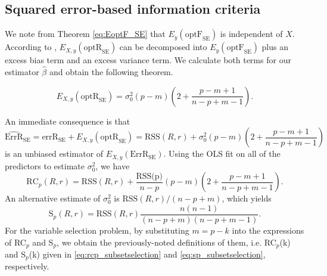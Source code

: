 \subsection{Squared error-based information criteria}
We note from Theorem \ref{eq:EoptF_SE} that $E_y(\text{optF}_\text{SE})$ is independent of $X$. According to \citet[formula 6 and proposition 1]{rosset2020fixed}, $E_{X,y}(\text{optR}_\text{SE})$ can be decomposed into $E_y(\text{optF}_\text{SE})$ plus an excess bias term and an excess variance term. We calculate both terms for our estimator $\hat\beta$ and obtain the following theorem.
\begin{theorem}
\begin{equation*}
E_{X,y}(\text{optR}_\text{SE}) = \sigma_0^2(p-m) \left( 2+ \frac{p-m+1}{n-p+m-1} \right).
\end{equation*}
\label{thm:EoptR_SE}
\end{theorem}
An immediate consequence is that
\begin{equation*}
\widehat{\text{ErrR}}_\text{SE} = \text{errR}_\text{SE} + E_{X,y} (\text{optR}_\text{SE}) = \text{RSS}(R,r) + \sigma_0^2(p-m) \left( 2+ \frac{p-m+1}{n-p+m-1} \right)
\end{equation*}
is an unbiased estimator of $E_{X,y}(\text{ErrR}_\text{SE})$. Using the OLS fit on all of the predictors to estimate $\sigma_0^2$, we have 
\begin{equation*}
\text{RC}_p(R,r) = \text{RSS}(R,r) + \frac{\text{RSS(p)}}{n-p}(p-m) \left(2+\frac{p-m+1}{n-p+m-1}\right).
\end{equation*}
An alternative estimate of $\sigma_0^2$ is $\text{RSS}(R,r)/(n-p+m)$, which yields 
\begin{equation*}
\text{S}_p(R,r) = \text{RSS}(R,r)\frac{n(n-1)}{(n-p+m)(n-p+m-1)}.
\end{equation*}
For the variable selection problem, by substituting $m=p-k$ into the expressions of RC$_p$ and S$_p$, we obtain the previously-noted definitions of them, i.e. RC$_p$(k) and S$_p$(k) given in \eqref{eq:rcp_subsetselection} and \eqref{eq:sp_subsetselection}, respectively. 
